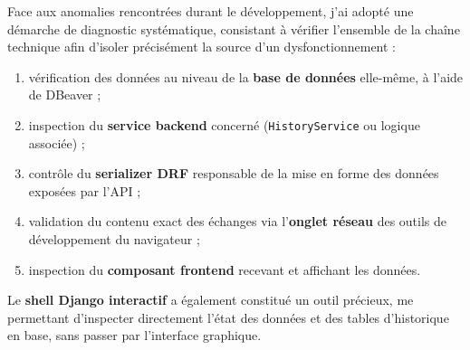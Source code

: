 Face aux anomalies rencontrées durant le développement, j'ai adopté une
démarche de diagnostic systématique, consistant à vérifier l'ensemble de
la chaîne technique afin d'isoler précisément la source d'un
dysfonctionnement :

\begin{enumerate}
  \item vérification des données au niveau de la \textbf{base de
        données} elle-même, à l'aide de DBeaver ;
  \item inspection du \textbf{service backend} concerné
        (\texttt{HistoryService} ou logique associée) ;
  \item contrôle du \textbf{serializer DRF} responsable de la mise en
        forme des données exposées par l'API ;
  \item validation du contenu exact des échanges via l'\textbf{onglet
        réseau} des outils de développement du navigateur ;
  \item inspection du \textbf{composant frontend} recevant et affichant
        les données.
\end{enumerate}

Le \textbf{shell Django interactif} a également constitué un outil
précieux, me permettant d'inspecter directement l'état des données et
des tables d'historique en base, sans passer par l'interface graphique.
